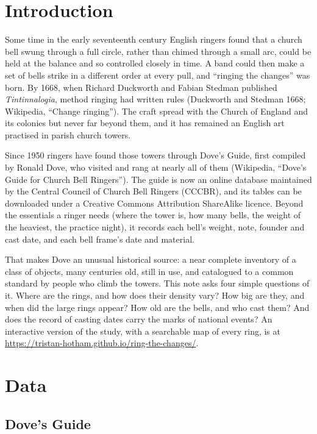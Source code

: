 \documentclass[11pt,a4paper]{article}
\begin{document}
\section{Introduction}

Some time in the early seventeenth century English ringers found that a church bell swung through a full circle, rather than chimed through a small arc, could be held at the balance and so controlled closely in time. A band could then make a set of bells strike in a different order at every pull, and ``ringing the changes'' was born. By 1668, when Richard Duckworth and Fabian Stedman published \textit{Tintinnalogia}, method ringing had written rules (Duckworth and Stedman 1668; Wikipedia, ``Change ringing''). The craft spread with the Church of England and its colonies but never far beyond them, and it has remained an English art practised in parish church towers.

Since 1950 ringers have found those towers through Dove's Guide, first compiled by Ronald Dove, who visited and rang at nearly all of them (Wikipedia, ``Dove's Guide for Church Bell Ringers''). The guide is now an online database maintained by the Central Council of Church Bell Ringers (CCCBR), and its tables can be downloaded under a Creative Commons Attribution ShareAlike licence. Beyond the essentials a ringer needs (where the tower is, how many bells, the weight of the heaviest, the practice night), it records each bell's weight, note, founder and cast date, and each bell frame's date and material.

That makes Dove an unusual historical source: a near complete inventory of a class of objects, many centuries old, still in use, and catalogued to a common standard by people who climb the towers. This note asks four simple questions of it. Where are the rings, and how does their density vary? How big are they, and when did the large rings appear? How old are the bells, and who cast them? And does the record of casting dates carry the marks of national events? An interactive version of the study, with a searchable map of every ring, is at \url{https://tristan-hotham.github.io/ring-the-changes/}.

\section{Data}

\subsection{Dove's Guide}
\end{document}
